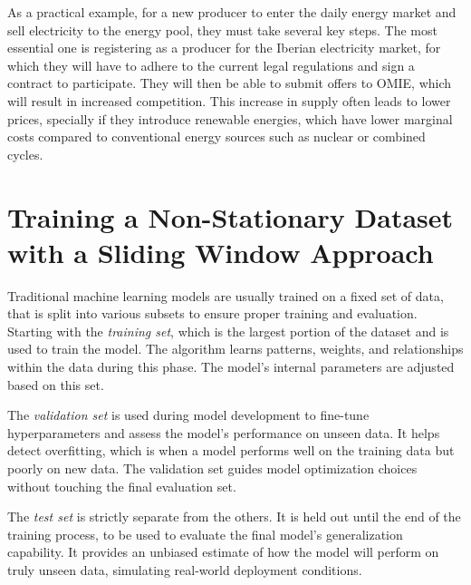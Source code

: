 \documentclass[12pt]{report} %
\begin{document}
As a practical example, for a new producer to enter the daily energy market and sell electricity to the energy pool, they must take several key steps. The most essential one is registering as a producer for the Iberian electricity market, for which they will have to adhere to the current legal regulations and sign a contract to participate. They will then be able to submit offers to OMIE, which will result in increased competition. This increase in supply often leads to lower prices, specially if they introduce renewable energies, which have lower marginal costs compared to conventional energy sources such as nuclear or combined cycles.


\section{Training a Non-Stationary Dataset with a Sliding Window Approach}

Traditional machine learning models are usually trained on a fixed set of data, that is split into various subsets to ensure proper training and evaluation. Starting with the \textit{training set}, which is the largest portion of the dataset and is used to train the model. The algorithm learns patterns, weights, and relationships within the data during this phase. The model’s internal parameters are adjusted based on this set.

The \textit{validation set} is used during model development to fine-tune hyperparameters and assess the model’s performance on unseen data. It helps detect overfitting, which is when a model performs well on the training data but poorly on new data. The validation set guides model optimization choices without touching the final evaluation set.

The \textit{test set} is strictly separate from the others. It is held out until the end of the training process, to be used to evaluate the final model’s generalization capability. It provides an unbiased estimate of how the model will perform on truly unseen data, simulating real-world deployment conditions.
\end{document}
